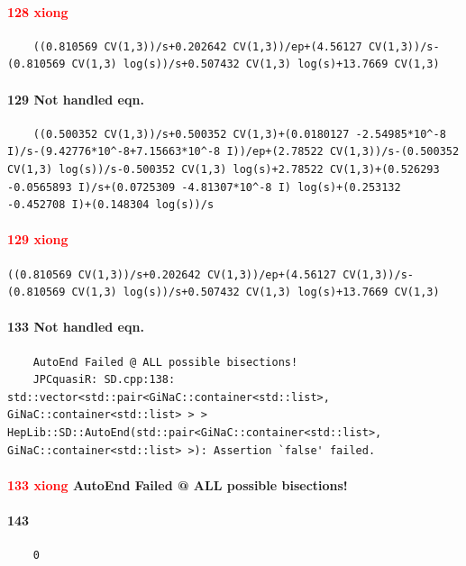 \documentclass{article}
\newcommand{\WN}[1]{\textcolor{RawSienna}{#1}}
\newcommand{\WNNH}{\WN{Not handled eqn. }}
\begin{document}
\paragraph{\textcolor{red}{128	xiong}}
\begin{verbatim}
	((0.810569 CV(1,3))/s+0.202642 CV(1,3))/ep+(4.56127 CV(1,3))/s-(0.810569 CV(1,3) log(s))/s+0.507432 CV(1,3) log(s)+13.7669 CV(1,3)
\end{verbatim}
\paragraph{129	\WNNH}
\begin{verbatim}
	((0.500352 CV(1,3))/s+0.500352 CV(1,3)+(0.0180127 -2.54985*10^-8 I)/s-(9.42776*10^-8+7.15663*10^-8 I))/ep+(2.78522 CV(1,3))/s-(0.500352 CV(1,3) log(s))/s-0.500352 CV(1,3) log(s)+2.78522 CV(1,3)+(0.526293 -0.0565893 I)/s+(0.0725309 -4.81307*10^-8 I) log(s)+(0.253132 -0.452708 I)+(0.148304 log(s))/s
\end{verbatim}
\paragraph{\textcolor{red}{129 xiong}}
\begin{verbatim}
((0.810569 CV(1,3))/s+0.202642 CV(1,3))/ep+(4.56127 CV(1,3))/s-(0.810569 CV(1,3) log(s))/s+0.507432 CV(1,3) log(s)+13.7669 CV(1,3)
\end{verbatim}
\paragraph{133	\WNNH}
\begin{verbatim}
	AutoEnd Failed @ ALL possible bisections!
	JPCquasiR: SD.cpp:138: std::vector<std::pair<GiNaC::container<std::list>, GiNaC::container<std::list> > > HepLib::SD::AutoEnd(std::pair<GiNaC::container<std::list>, GiNaC::container<std::list> >): Assertion `false' failed.
\end{verbatim}
\paragraph{\textcolor{red}{133	xiong} AutoEnd Failed @ ALL possible bisections!}

\paragraph{143}
\begin{verbatim}
	0
\end{verbatim}
\end{document}
